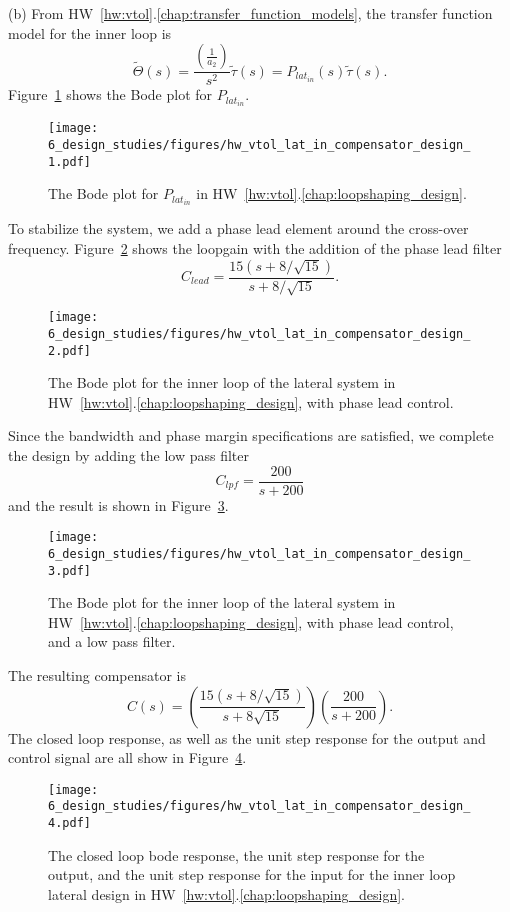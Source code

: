 (b)
From HW~\ref{hw:vtol}.\ref{chap:transfer_function_models}, the transfer function model for the inner loop is
\[
\tilde{\Theta}(s) = \frac{\left(\frac{1}{a_2}\right)}{s^2}\tilde{\tau}(s) = P_{lat_{in}}(s)\tilde{\tau}(s).
\]
Figure~\ref{fig:hw_vtol_lat_in_compensator_design_1} shows the Bode plot for $P_{lat_{in}}$. 
\begin{figure}[H]
   \centering
   \texttt{[image: 6\_design\_studies/figures/hw\_vtol\_lat\_in\_compensator\_design\_1.pdf]}
   \caption{The Bode plot for $P_{lat_{in}}$ in HW~\ref{hw:vtol}.\ref{chap:loopshaping_design}.}
   \label{fig:hw_vtol_lat_in_compensator_design_1}
\end{figure}

To stabilize the system, we add a phase lead element around the cross-over frequency.  Figure~\ref{fig:hw_vtol_lat_in_compensator_design_2} shows the loopgain with the addition of the phase lead filter
\[
C_{lead} = \frac{15(s+8/\sqrt{15})}{s+8/\sqrt{15}}.
\]
\begin{figure}[H]
   \centering
   \texttt{[image: 6\_design\_studies/figures/hw\_vtol\_lat\_in\_compensator\_design\_2.pdf]}
   \caption{The Bode plot for the inner loop of the lateral system in HW~\ref{hw:vtol}.\ref{chap:loopshaping_design}, with phase lead control.}
   \label{fig:hw_vtol_lat_in_compensator_design_2}
\end{figure}
Since the bandwidth and phase margin specifications are satisfied, we complete the design by adding the low pass filter
\[
C_{lpf} = \frac{200}{s+200}
\]
and the result is shown in Figure~\ref{fig:hw_vtol_lat_in_compensator_design_3}.
\begin{figure}[H]
   \centering
   \texttt{[image: 6\_design\_studies/figures/hw\_vtol\_lat\_in\_compensator\_design\_3.pdf]}
   \caption{The Bode plot for the inner loop of the lateral system in HW~\ref{hw:vtol}.\ref{chap:loopshaping_design}, with phase lead control, and a low pass  filter.}
   \label{fig:hw_vtol_lat_in_compensator_design_3}
\end{figure}
The resulting compensator is
\[
C(s) = \left(\frac{15(s+8/\sqrt{15})}{s+8\sqrt{15}}\right)\left(\frac{200}{s+200}\right).
\]
The closed loop response, 
as well as the unit step response for the output and control signal are all show in Figure~\ref{fig:hw_vtol_lat_in_compensator_design_4}.
\begin{figure}[H]
   \centering
   \texttt{[image: 6\_design\_studies/figures/hw\_vtol\_lat\_in\_compensator\_design\_4.pdf]}
   \caption{The closed loop bode response, the unit step response for the output, and the unit step response for the input for the inner loop lateral design in HW~\ref{hw:vtol}.\ref{chap:loopshaping_design}.}
   \label{fig:hw_vtol_lat_in_compensator_design_4}
\end{figure}

